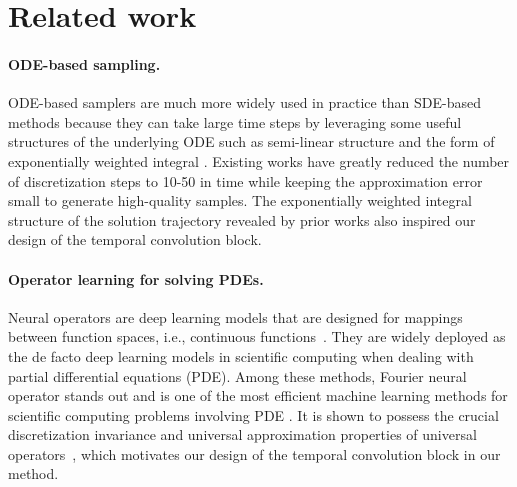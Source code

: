 \section{Related work}

\paragraph{ODE-based sampling.}
ODE-based samplers are much more widely used in practice \cite{stablediffusion} than SDE-based methods because they can take large time steps by leveraging some useful structures of the underlying ODE such as semi-linear structure and the form of exponentially weighted integral \cite{lu2022dpm, zhang2022fast}. Existing works \cite{song2021denoising, bao2021analytic, zhang2022fast,dockhorn2022genie} have greatly reduced the number of discretization steps to 10-50 in time while keeping the approximation error small to generate high-quality samples. The exponentially weighted integral structure of the solution trajectory revealed by prior works also inspired our design of the temporal convolution block. 
\vspace{-0.1in}
\paragraph{Operator learning for solving PDEs.}
Neural operators are deep learning models that are designed for mappings between function spaces, i.e., continuous functions~\cite{li2020neural,kovachki2021universal}. They are widely deployed as the de facto deep learning models in scientific computing when dealing with partial differential equations (PDE).
Among these methods, Fourier neural operator stands out and is one of the most efficient machine learning methods for scientific computing problems involving PDE
\cite{yang2021seismic,wen2022accelerating}. It is shown to possess the crucial discretization invariance and universal approximation properties of universal operators~\citep{kovachki2021universal,kovachki2021neural}, which motivates our design of the temporal convolution block in our method.


